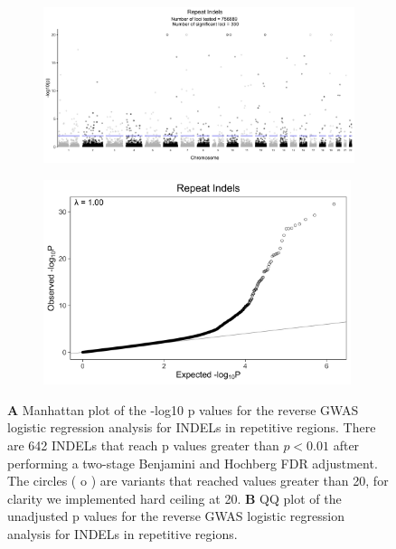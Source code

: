 \documentclass[9pt,lineno]{elife}
\begin{document}
\begin{figure} \centering
    \begin{subfigure}[b]{\linewidth}
        \includegraphics[width=\hsize]{./Figures/ManhattanPlot_Repeat_Indels.jpg}
        \label{fig:a}
    \end{subfigure} %

    \begin{subfigure}[b]{\linewidth}
    	\center    
        \includegraphics[width=90mm]{./Figures/Repeat_Indels_QQ.jpg}
        \label{fig:b}    
    \end{subfigure} 
    \caption{\textbf{A} Manhattan plot of the -log10 p values for the reverse GWAS logistic regression analysis for INDELs in repetitive regions. There are 642 INDELs that reach p values greater than $ p < 0.01$ after performing a two-stage Benjamini and Hochberg FDR adjustment.  The circles ( o ) are variants that reached values greater than 20, for clarity we implemented hard ceiling at 20. 
  \textbf{B} QQ plot of the unadjusted p values for the reverse GWAS logistic regression analysis for INDELs in repetitive regions.}
  \label{RI_Manhattan}
  \end{figure}
\end{document}
